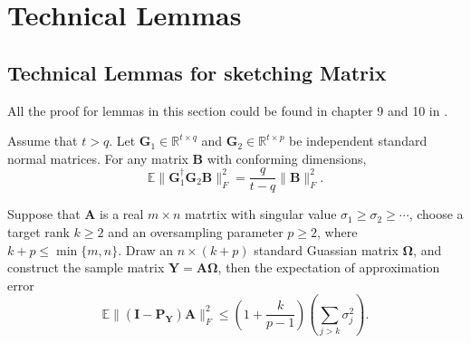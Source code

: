 \section{Technical Lemmas}
\subsection{Technical Lemmas for sketching Matrix}
All the proof for lemmas in this section could be found in chapter 9 and 10 in \cite{halko2011finding}.
\begin{lem}
\label{lemma:expectation_inverse_gaussian}
Assume that $t>q$. Let $\mathbf{G}_1\in \mathbb{R}^{t\times q}$ and $\mathbf{G}_2\in \mathbb{R}^{t\times p}$ be independent standard normal matrices. For any matrix $\mathbf{B}$ with conforming dimensions, 
\begin{equation}
\mathbb{E} \|\mathbf{G}_1^\dag \mathbf{G}_2 \mathbf{B}\|_F^2 = \frac{q}{t-q} \|\mathbf{B}\|_F^2. 
\end{equation}
\end{lem}

\begin{lem}
\label{lemma:sketchy_column_space_err}
Suppose that $\mathbf{A}$ is a real $m\times n$ matrtix with singular value $\sigma_1\ge \sigma_2\ge \cdots$, choose a target rank $k\ge 2$ and an oversampling parameter $p\ge 2$, where $k+p\le \min\{m,n\}$. Draw an $n\times (k+p)$ standard Guassian matrix $\mathbf{\Omega}$, and construct the sample matrix $\mathbf{Y}=\mathbf{A\Omega}$, then the expectation of approximation error 
\begin{equation}
\mathbb{E}\|(\mathbf{I} - \mathbf{P_Y})\mathbf{A}\|_F^2\le \left(1+\frac{k}{p-1}\right)\left(\sum_{j>k} \sigma_j^2\right).
\end{equation}
\end{lem}

